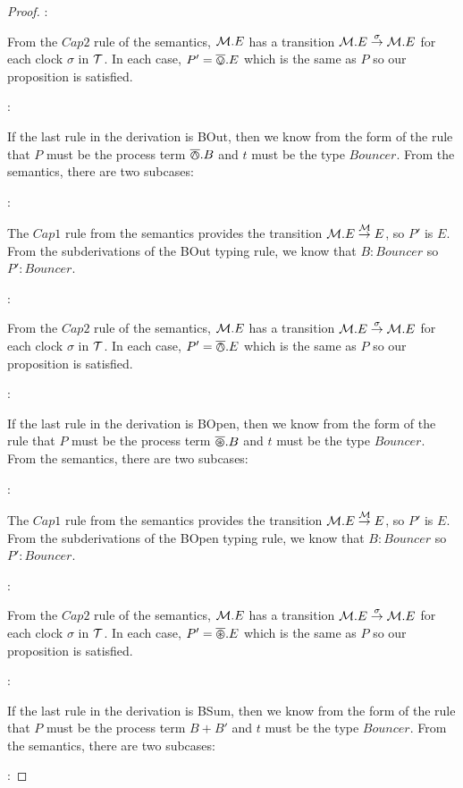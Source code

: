 \begin{proof}
:

\noindent From the $Cap2$ rule of the semantics, $\text{$\mathcal{M}$}.E$ has a
transition $\text{$\mathcal{M}$}.E \stackrel{\sigma}{\rightarrow} \text{$\mathcal{M}$}.E$ for each clock
$\sigma$ in $\text{$\mathcal{T}$}$.  In each case, $P' = \overline{\varovee}.E$ which is the same
as $P$ so our proposition is satisfied.

:

\noindent If the last rule in the derivation is BOut, then we know from
the form of the rule that $P$ must be the process term $\overline{\varowedge}.B$ and
$t$ must be the type $Bouncer$.  From the semantics, there are two
subcases:

:

\noindent The $Cap1$ rule from the semantics provides the transition
$\text{$\mathcal{M}$}.E \stackrel{\text{$\mathcal{M}$}}{\rightarrow} E$, so $P'$ is $E$.  From the
subderivations of the BOut typing rule, we know that $B : Bouncer$ so
$P' : Bouncer$.

:

\noindent From the $Cap2$ rule of the semantics, $\text{$\mathcal{M}$}.E$ has a
transition $\text{$\mathcal{M}$}.E \stackrel{\sigma}{\rightarrow} \text{$\mathcal{M}$}.E$ for each clock
$\sigma$ in $\text{$\mathcal{T}$}$.  In each case, $P' = \overline{\varowedge}.E$ which is the same
as $P$ so our proposition is satisfied.

:

\noindent If the last rule in the derivation is BOpen, then we know from
the form of the rule that $P$ must be the process term $\overline{\varoast}.B$ and
$t$ must be the type $Bouncer$.  From the semantics, there are two
subcases:

:

\noindent The $Cap1$ rule from the semantics provides the transition
$\text{$\mathcal{M}$}.E \stackrel{\text{$\mathcal{M}$}}{\rightarrow} E$, so $P'$ is $E$.  From the
subderivations of the BOpen typing rule, we know that $B : Bouncer$ so
$P' : Bouncer$.

:

\noindent From the $Cap2$ rule of the semantics, $\text{$\mathcal{M}$}.E$ has a
transition $\text{$\mathcal{M}$}.E \stackrel{\sigma}{\rightarrow} \text{$\mathcal{M}$}.E$ for each clock
$\sigma$ in $\text{$\mathcal{T}$}$.  In each case, $P' = \overline{\varoast}.E$ which is the
same as $P$ so our proposition is satisfied.

:

\noindent If the last rule in the derivation is BSum, then we know
from the form of the rule that $P$ must be the process term $B + B'$
and $t$ must be the type $Bouncer$.  From the semantics, there are two
subcases:

:


\end{proof}
